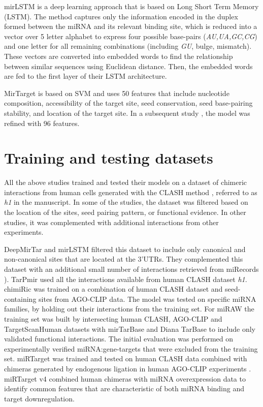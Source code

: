 mirLSTM \cite{paker2019mirlstm} is a deep learning approach that is based on Long Short Term Memory (LSTM). The method captures only the information encoded in the duplex formed between the miRNA and its relevant binding site, which is reduced into a vector over 5 letter alphabet to express four possible base-pairs (\textit{AU,UA,GC,CG}) and one letter for all remaining combinations (including \textit{GU}, bulge, mismatch). These vectors are converted into embedded words to find the relationship between similar sequences using Euclidean distance. Then, the embedded words are fed to the first layer of their LSTM architecture. 

MirTarget \cite{wang2016improving} is based on SVM and uses 50 features that include nucleotide composition, accessibility of the target site, seed conservation, seed base-pairing stability, and location of the target site. In a subsequent study \cite{liu2019prediction}, the model was refined with 96 features. 

\section{Training and testing datasets}
All the above studies trained and tested their models on a dataset of chimeric interactions from human cells generated with the CLASH method \cite{helwak2013mapping}, referred to as \textit{h1} in the manuscript. In some of the studies, the dataset was filtered based on the location of the sites, seed pairing pattern, or functional evidence. In other studies, it was complemented with additional interactions from other experiments.

DeepMirTar \cite{wen2018deepmirtar} and mirLSTM \cite{paker2019mirlstm} filtered this dataset to include only canonical and non-canonical sites that are located at the 3'UTRs. They complemented this dataset with an additional small number of interactions retrieved from miRecords \cite{xiao2009mirecords}). TarPmir \cite{ding2016tarpmir} used all the interactions available from human CLASH dataset \textit{h1}.
chimiRic \cite{lu2016learning} was trained on a combination of human CLASH dataset and seed-containing sites from AGO-CLIP data. The model was tested on specific miRNA families, by holding out their interactions from the training set. For miRAW \cite{pla2018miraw} the training set was built by intersecting human CLASH, AGO-CLIP and TargetScanHuman \cite{agarwal2015predicting} datasets with mirTarBase \cite{chou2016mirtarbase} and Diana TarBase \cite{vlachos2015diana} to include only validated functional interactions. The initial evaluation was performed on experimentally verified miRNA:gene-targets that were excluded from the training set. 
miRTarget  \cite{wang2016improving} was trained and tested on human CLASH data combined with chimeras generated by endogenous ligation in human AGO-CLIP experiments \cite{grosswendt2014unambiguous}. miRTarget v4 \cite{liu2019prediction} combined human chimeras with miRNA overexpression data to identify common features that are characteristic of both miRNA binding and target downregulation.

